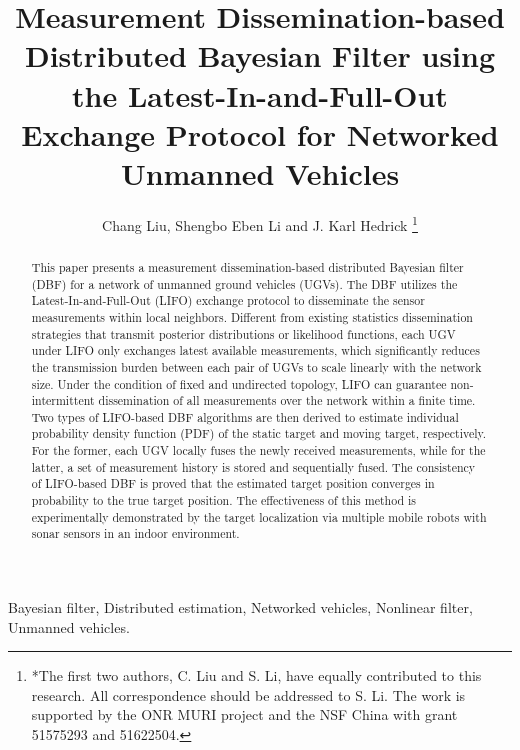 \documentclass[journal]{IEEEtranTIE}
\title{\LARGE \bf
	Measurement Dissemination-based Distributed Bayesian Filter using the Latest-In-and-Full-Out Exchange Protocol for Networked Unmanned Vehicles}
\author{Chang Liu, Shengbo Eben Li and J. Karl Hedrick%
	\thanks{*The first two authors, C. Liu and S. Li, have equally contributed to this research. All correspondence should be addressed to S. Li. The work is supported by the ONR MURI project and the NSF China with grant 51575293 and 51622504.}
}
\theoremstyle{remark}
\newcommand{\todopara}[1]{\vspace{0px} %
	\todo[inline, color=black!10]{\textbf{[Paragraph:]} {#1}} %
}
\newcommand{\todonote}[1]{\vspace{0px} %
	\todo[inline, color=green!30]{\textbf{[Note:]} {#1}} %
}
\newcommand{\todoQ}[1]{\vspace{0px} %
	\todo[inline, color=orange!50]{\textbf{[Note:]} {#1}} %
}
\newcommand{\todohere}[1]{\hl{(\textbf{TODO:} #1)}}
\newcommand{\hidetodos}{
	\renewcommand{\todopara}[1]{}
	\renewcommand{\todonote}[1]{}
	\renewcommand{\todoQ}[1]{}
	\renewcommand{\todohere}[1]{}
}
\begin{document}
	
	
	\maketitle
	\thispagestyle{empty}
	\pagestyle{empty}
	
	
	\begin{abstract}
		This paper presents a measurement dissemination-based distributed Bayesian filter (DBF) for a network of unmanned ground vehicles (UGVs).
		The DBF utilizes the Latest-In-and-Full-Out (LIFO) exchange protocol to disseminate the sensor measurements within local neighbors.
		Different from existing statistics dissemination strategies that transmit posterior distributions or likelihood functions, each UGV under LIFO only exchanges
		latest available measurements,
		which significantly reduces the transmission burden between each pair of UGVs to scale linearly with the network size.
		Under the condition of fixed and undirected topology, LIFO can guarantee non-intermittent dissemination of all measurements over the network within a finite time.
		Two types of LIFO-based DBF algorithms are then derived to estimate individual probability density function (PDF) of the static target and moving target, respectively. 
		For the former, each UGV locally fuses the newly received measurements, while for the latter, a set of measurement history is stored and sequentially fused. 
		The consistency of LIFO-based DBF is proved that the estimated target position converges in probability to the true target position.
		The effectiveness of this method is experimentally demonstrated by the target localization via multiple mobile robots with sonar sensors in an indoor environment.
	\end{abstract}
	
	\begin{IEEEkeywords}
		Bayesian filter, Distributed estimation, Networked vehicles, Nonlinear filter, Unmanned vehicles.
	\end{IEEEkeywords}
\end{document}
